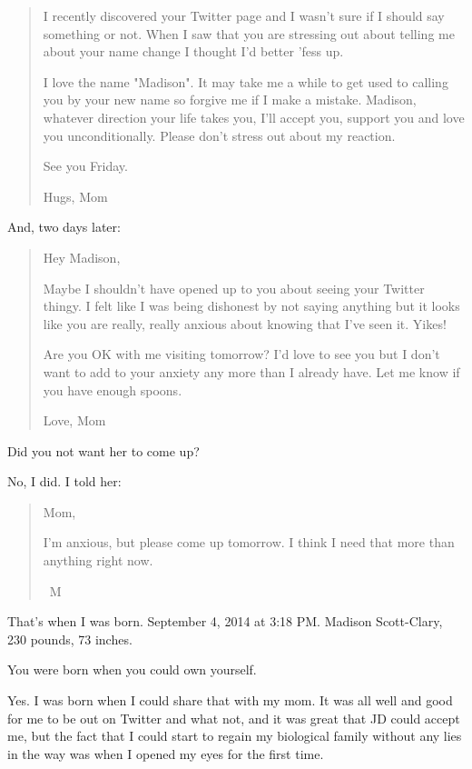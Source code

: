 \begin{paracol}{2}
\begin{leftcolumn}
\begin{quotation}
I recently discovered your Twitter page and I wasn't sure if I should say something or not.  When I saw that you are stressing out about telling me about your name change I thought I'd better 'fess up.

I love the name "Madison".  It may take me a while to get used to calling you by your new name so forgive me if I make a mistake.  Madison, whatever direction your life takes you, I'll accept you, support you and love you unconditionally.  Please don't stress out about my reaction.

See you Friday.

Hugs,
Mom
\end{quotation}

And, two days later:

\begin{quotation}
Hey Madison,

Maybe I shouldn't have opened up to you about seeing your Twitter thingy.  I felt like I was being dishonest by not saying anything but it looks like you are really, really anxious about knowing that I've seen it.  Yikes!

Are you OK with me visiting tomorrow?  I'd love to see you but I don't want to add to your anxiety any more than I already have.  Let me know if you have enough spoons.

Love,
Mom
\end{quotation}

\begin{ally}
Did you not want her to come up?
\end{ally}
No, I did. I told her:

\begin{quotation}
Mom,

I'm anxious, but please come up tomorrow. I think I need that more than anything right now.

~M
\end{quotation}

That's when I was born. September 4, 2014 at 3:18 PM. Madison Scott-Clary, 230 pounds, 73 inches.

\begin{ally}
You were born when you could own yourself.
\end{ally}
Yes. I was born when I could share that with my mom. It was all well and good for me to be out on Twitter and what not, and it was great that JD could accept me, but the fact that I could start to regain my biological family without any lies in the way was when I opened my eyes for the first time.


\end{leftcolumn}
\end{paracol}
